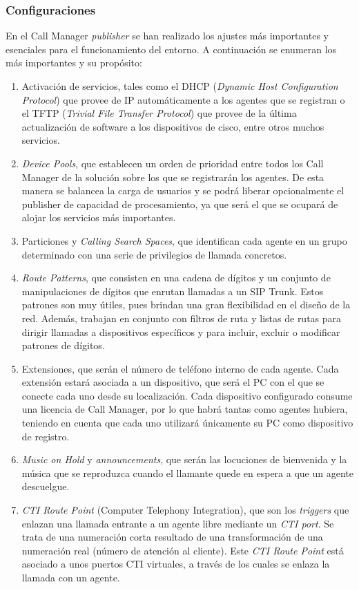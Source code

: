 \documentclass[a4paper, 12pt]{book}
\begin{document}
\subsubsection{Configuraciones}
\label{sec:conf_cucm}
En el Call Manager \emph{publisher} se han realizado los ajustes más importantes y esenciales para el funcionamiento del entorno. A continuación se enumeran los más importantes y su propósito:
\begin{enumerate}
  \item Activación de servicios, tales como el DHCP (\emph{Dynamic Host Configuration Protocol}) que provee de IP automáticamente a los agentes que se registran o el TFTP (\emph{Trivial File Transfer Protocol}) que provee de la última actualización de software a los dispositivos de cisco, entre otros muchos servicios.
  \item \emph{Device Pools}, que establecen un orden de prioridad entre todos los Call Manager de la solución sobre los que se registrarán los agentes. De esta manera se balancea la carga de usuarios y se podrá liberar opcionalmente el publisher de capacidad de procesamiento, ya que será el que se ocupará de alojar los servicios más importantes.
  \item Particiones y \emph{Calling Search Spaces}, que identifican cada agente en un grupo determinado con una serie de privilegios de llamada concretos.
  \item \emph{Route Patterns}, que consisten en una cadena de dígitos y un conjunto de manipulaciones de dígitos que enrutan llamadas a un SIP Trunk. Estos patrones son muy útiles, pues brindan una gran flexibilidad en el diseño de la red. Además, trabajan en conjunto con filtros de ruta y listas de rutas para dirigir llamadas a dispositivos específicos y para incluir, excluir o modificar patrones de dígitos.
  \item Extensiones, que serán el número de teléfono interno de cada agente. Cada extensión estará asociada a un dispositivo, que será el PC con el que se conecte cada uno desde su localización. Cada dispositivo configurado consume una licencia de Call Manager, por lo que habrá tantas como agentes hubiera, teniendo en cuenta que cada uno utilizará únicamente su PC como dispositivo de registro.
  \item \emph{Music on Hold} y \emph{announcements}, que serán las locuciones de bienvenida y la música que se reproduzca cuando el llamante quede en espera a que un agente descuelgue.
  \item \emph{CTI Route Point} (Computer Telephony Integration), que son los \emph{triggers} que enlazan una llamada entrante a un agente libre mediante un \emph{CTI port}. Se trata de una numeración corta resultado de una transformación de una numeración real (número de atención al cliente). Este \emph{CTI Route Point} está asociado a unos puertos CTI virtuales, a través de los cuales se enlaza la llamada con un agente.

\end{enumerate}
\end{document}
